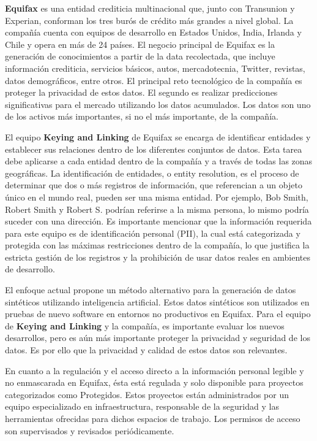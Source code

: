 \textbf{Equifax} es una entidad crediticia multinacional que, junto con Transunion y Experian, conforman los tres burós de crédito más grandes a nivel global. La compañía cuenta con equipos de desarrollo en Estados Unidos, India, Irlanda y Chile y opera en más de 24 países. El negocio principal de Equifax es la generación de conocimientos a partir de la data recolectada, que incluye información crediticia, servicios básicos, autos, mercadotecnia, Twitter, revistas, datos demográficos, entre otros. El principal reto tecnológico de la compañía es proteger la privacidad de estos datos. El segundo es realizar predicciones significativas para el mercado utilizando los datos acumulados.
Los datos son uno de los activos más importantes, si no el más importante, de la compañía.

El equipo \textbf{Keying and Linking} de Equifax se encarga de identificar entidades y establecer sus relaciones dentro de los diferentes conjuntos de datos. Esta tarea debe aplicarse a cada entidad dentro de la compañía y a través de todas las zonas geográficas. La identificación de entidades, o entity resolution, es el proceso de determinar que dos o más registros de información, que referencian a un objeto único en el mundo real, pueden ser una misma entidad. Por ejemplo, Bob Smith, Robert Smith y Robert S. podrían referirse a la misma persona, lo mismo podría suceder con una dirección. Es importante mencionar que la información requerida para este equipo es de identificación personal (PII), la cual está categorizada y protegida con las máximas restricciones dentro de la compañía, lo que justifica la estricta gestión de los registros y la prohibición de usar datos reales en ambientes de desarrollo.

El enfoque actual propone un método alternativo para la generación de datos sintéticos utilizando inteligencia artificial. Estos datos sintéticos son utilizados en pruebas de nuevo software en entornos no productivos en Equifax. Para el equipo de \textbf{Keying and Linking} y la compañía, es importante evaluar los nuevos desarrollos, pero es aún más importante proteger la privacidad y seguridad de los datos. Es por ello que la privacidad y calidad de estos datos son relevantes.

En cuanto a la regulación y el acceso directo a la información personal legible y no enmascarada en Equifax, ésta está regulada y solo disponible para proyectos categorizados como Protegidos. Estos proyectos están administrados por un equipo especializado en infraestructura, responsable de la seguridad y las herramientas ofrecidas para dichos espacios de trabajo. Los permisos de acceso son supervisados y revisados periódicamente.

